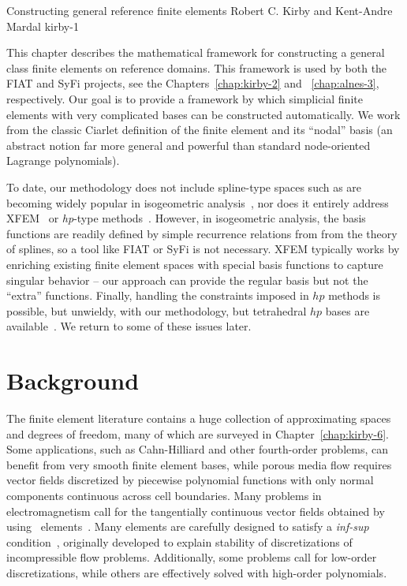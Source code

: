 \newcommand{\mathbfx}[1]{{\mbox{\boldmath $#1$}}}
\renewcommand{\P}{{\mathbb P}}
\renewcommand{\H}{{\mathbb H}}
\newcommand{\GG}{\mathbf{G}}
\newcommand{\kentc}[1]{\marginpar{\tiny KAM: #1}}
\newcommand{\rckc}[1]{\marginpar{\tiny RCK: #1}}

              {Constructing general reference finite elements}
              {Robert C. Kirby and Kent-Andre Mardal}
              {kirby-1}


This chapter describes the mathematical framework for constructing a
general class finite elements on reference domains. This framework is used
by both the FIAT and SyFi projects, see the Chapters~\ref{chap:kirby-2}
and ~\ref{chap:alnes-3}, respectively.  Our goal is to provide a framework
by which simplicial finite elements with very complicated bases can be
constructed automatically.  We work from the classic Ciarlet definition
of the finite element and its ``nodal'' basis (an abstract notion far more
general and powerful than standard node-oriented Lagrange polynomials).

To date, our methodology does not include spline-type
spaces such as are becoming widely popular in isogeometric
analysis~\citep{HughesCottrellBazilevs2005}, nor does it entirely
address XFEM~\citep{ChessaSmolinskiBelytschko2002} or {\em hp}-type
methods~\citep{Schwab1998}.  However, in isogeometric analysis, the
basis functions are readily defined by simple recurrence relations
from from the theory of splines, so a tool like FIAT or SyFi is not
necessary.  XFEM typically works by enriching existing finite element
spaces with special basis functions to capture singular behavior -- our
approach can provide the regular basis but not the ``extra'' functions.
Finally, handling the constraints imposed in $hp$ methods is possible,
but unwieldy, with our methodology, but tetrahedral $hp$ bases are
available~\citep{AinsworthCoyle2003}.  We return to some of these
issues later.

\section{Background}
The finite element literature contains a huge collection of
approximating spaces and degrees of freedom, many of which are
surveyed in Chapter~\ref{chap:kirby-6}.  Some applications, such
as Cahn-Hilliard and other fourth-order problems, can benefit from
very smooth finite element bases, while porous media flow requires
vector fields discretized by piecewise polynomial functions with only
normal components continuous across cell boundaries.  Many problems
in electromagnetism call for the tangentially continuous vector fields
obtained by using \nedelec\ elements~\citep{Nedelec1980,Nedelec1986}.
Many elements are carefully designed to satisfy a \emph{inf-sup}
condition~\citep{BrezziFortin1991,GiraultRaviart1986}, originally
developed to explain stability of discretizations of incompressible flow
problems.  Additionally, some problems call for low-order discretizations,
while others are effectively solved with high-order polynomials.

